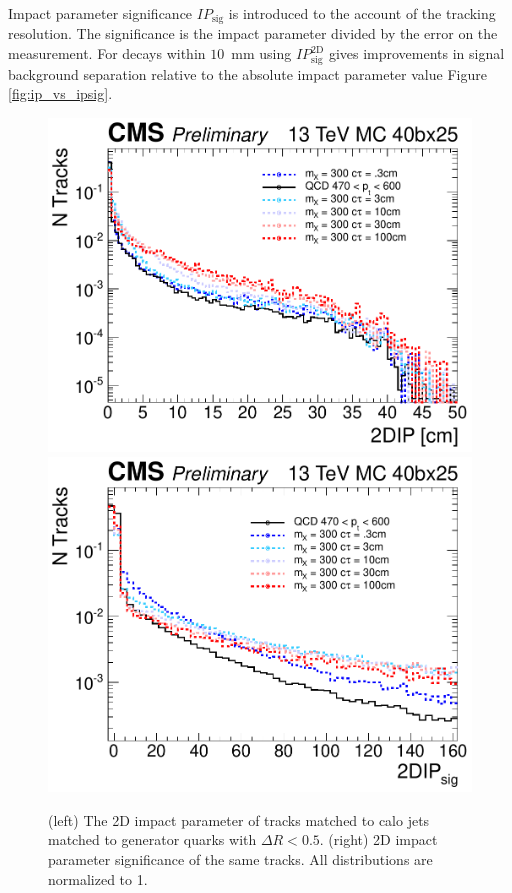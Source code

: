 Impact parameter significance $IP_{\textrm{sig}}$ is introduced to the account of the tracking resolution. The significance is the impact parameter divided by the error
on the measurement. For decays within $10$~mm using $IP_{\textrm{sig}}^{\textrm{2D}}$ gives improvements in signal background separation relative to the absolute impact parameter value Figure \ref{fig:ip_vs_ipsig}.
\begin{figure}
\begin{center}
\includegraphics[width=.45\textwidth]{figures/an_jetid/VTX_MATCH_IP/liTrackIP2D}
\includegraphics[width=.45\textwidth]{figures/an_jetid/VTX_MATCH_IP/liTrackIPSig2D}\\
\end{center}
\caption{(left) The 2D impact parameter of tracks matched to calo jets matched to generator quarks with $\Delta R < 0.5$.
 (right) 2D impact parameter significance of the same tracks. All distributions are normalized to 1.}
\label{fig:iptrack}
\end{figure}

